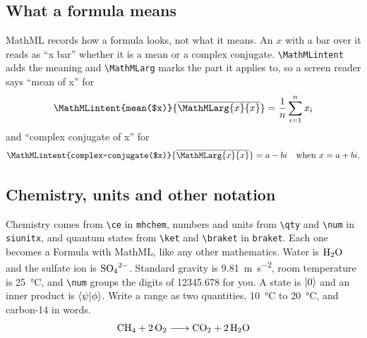 \documentclass[12pt]{article}
\begin{document}
\subsection{What a formula means}
MathML records how a formula looks, not what it means. An $x$ with a bar over
it reads as ``x bar'' whether it is a mean or a complex conjugate.
\verb|\MathMLintent| adds the meaning and \verb|\MathMLarg| marks the part it
applies to, so a screen reader says ``mean of x'' for
\begin{equation}
  \MathMLintent{mean($x)}{{\overline{\MathMLarg{x}{x}}}}
  = \frac{1}{n} \sum_{i=1}^{n} x_i
\end{equation}
and ``complex conjugate of x'' for
\begin{equation}
  \MathMLintent{complex-conjugate($x)}{{\overline{\MathMLarg{x}{x}}}}
  = a - bi \quad \text{when } x = a + bi.
\end{equation}
\subsection{Chemistry, units and other notation}
\label{sec:notation}
Chemistry comes from \verb|\ce| in \texttt{mhchem}, numbers and units from
\verb|\qty| and \verb|\num| in \texttt{siunitx}, and quantum states from
\verb|\ket| and \verb|\braket| in \texttt{braket}. Each one becomes a Formula
with MathML, like any other mathematics.
Water is $\ce{H2O}$ and the sulfate ion is $\ce{SO4^2-}$. Standard gravity is
\qty{9.81}{\metre\per\second\squared}, room temperature is \qty{25}{\celsius},
and \verb|\num| groups the digits of \num{12345.678} for you. A state is
$\ket{0}$ and an inner product is $\braket{\psi|\phi}$. Write a range as two
quantities, \qty{10}{\celsius} to \qty{20}{\celsius}, and carbon-14 in words.
\begin{equation}\label{eq:burn} \ce{CH4 + 2O2 -> CO2 + 2H2O} \end{equation}
\end{document}
